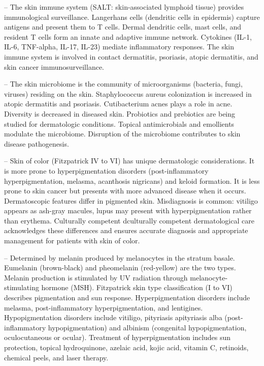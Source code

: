 -- The skin immune system (SALT: skin-associated lymphoid tissue) provides immunological surveillance. Langerhans cells (dendritic cells in epidermis) capture antigens and present them to T cells. Dermal dendritic cells, mast cells, and resident T cells form an innate and adaptive immune network. Cytokines (IL-1, IL-6, TNF-alpha, IL-17, IL-23) mediate inflammatory responses. The skin immune system is involved in contact dermatitis, psoriasis, atopic dermatitis, and skin cancer immunosurveillance.

-- The skin microbiome is the community of microorganisms (bacteria, fungi, viruses) residing on the skin. Staphylococcus aureus colonization is increased in atopic dermatitis and psoriasis. Cutibacterium acnes plays a role in acne. Diversity is decreased in diseased skin. Probiotics and prebiotics are being studied for dermatologic conditions. Topical antimicrobials and emollients modulate the microbiome. Disruption of the microbiome contributes to skin disease pathogenesis.

-- Skin of color (Fitzpatrick IV to VI) has unique dermatologic considerations. It is more prone to hyperpigmentation disorders (post-inflammatory hyperpigmentation, melasma, acanthosis nigricans) and keloid formation. It is less prone to skin cancer but presents with more advanced disease when it occurs. Dermatoscopic features differ in pigmented skin. Misdiagnosis is common: vitiligo appears as ash-gray macules, lupus may present with hyperpigmentation rather than erythema. Culturally competent dculturally competent dermatological care acknowledges these differences and ensures accurate diagnosis and appropriate management for patients with skin of color.

-- Determined by melanin produced by melanocytes in the stratum basale. Eumelanin (brown-black) and pheomelanin (red-yellow) are the two types. Melanin production is stimulated by UV radiation through melanocyte-stimulating hormone (MSH). Fitzpatrick skin type classification (I to VI) describes pigmentation and sun response. Hyperpigmentation disorders include melasma, post-inflammatory hyperpigmentation, and lentigines. Hypopigmentation disorders include vitiligo, pityriasis apityriasis alba (post-inflammatory hypopigmentation) and albinism (congenital hypopigmentation, oculocutaneous or ocular). Treatment of hyperpigmentation includes sun protection, topical hydroquinone, azelaic acid, kojic acid, vitamin C, retinoids, chemical peels, and laser therapy.

